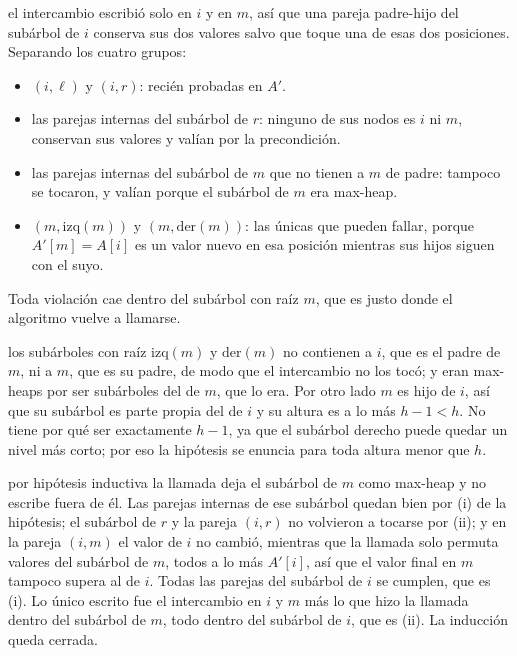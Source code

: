 \documentclass[11pt,letterpaper]{article}
\begin{document}
 el intercambio escribió solo
en $i$ y en $m$, así que una pareja padre-hijo del subárbol de $i$
conserva sus dos valores salvo que toque una de esas dos posiciones.
Separando los cuatro grupos:
\begin{itemize}
  \item $(i, \ell)$ y $(i, r)$: recién probadas en $A'$.
  \item las parejas internas del subárbol de $r$: ninguno de sus nodos
        es $i$ ni $m$, conservan sus valores y valían por la
        precondición.
  \item las parejas internas del subárbol de $m$ que no tienen a $m$
        de padre: tampoco se tocaron, y valían porque el subárbol de
        $m$ era max-heap.
  \item $(m, \mathrm{izq}(m))$ y $(m, \mathrm{der}(m))$: las únicas
        que pueden fallar, porque $A'[m] = A[i]$ es un valor nuevo en
        esa posición mientras sus hijos siguen con el suyo.
\end{itemize}
Toda violación cae dentro del subárbol con raíz $m$, que es justo
donde el algoritmo vuelve a llamarse.

los subárboles con raíz $\mathrm{izq}(m)$ y $\mathrm{der}(m)$ no
contienen a $i$, que es el padre de $m$, ni a $m$, que es su padre, de
modo que el intercambio no los tocó; y eran max-heaps por ser
subárboles del de $m$, que lo era. Por otro lado $m$ es hijo de $i$,
así que su subárbol es parte propia del de $i$ y su altura es a lo más
$h - 1 < h$. No tiene por qué ser exactamente $h - 1$, ya que el
subárbol derecho puede quedar un nivel más corto; por eso la hipótesis
se enuncia para toda altura menor que $h$.

 por hipótesis inductiva la llamada deja el subárbol de
$m$ como max-heap y no escribe fuera de él. Las parejas internas de
ese subárbol quedan bien por (i) de la hipótesis; el subárbol de $r$ y
la pareja $(i, r)$ no volvieron a tocarse por (ii); y en la pareja
$(i, m)$ el valor de $i$ no cambió, mientras que la llamada solo
permuta valores del subárbol de $m$, todos a lo más $A'[i]$, así que
el valor final en $m$ tampoco supera al de $i$. Todas las parejas del
subárbol de $i$ se cumplen, que es (i). Lo único escrito fue el
intercambio en $i$ y $m$ más lo que hizo la llamada dentro del
subárbol de $m$, todo dentro del subárbol de $i$, que es (ii). La
inducción queda cerrada.
\end{document}
